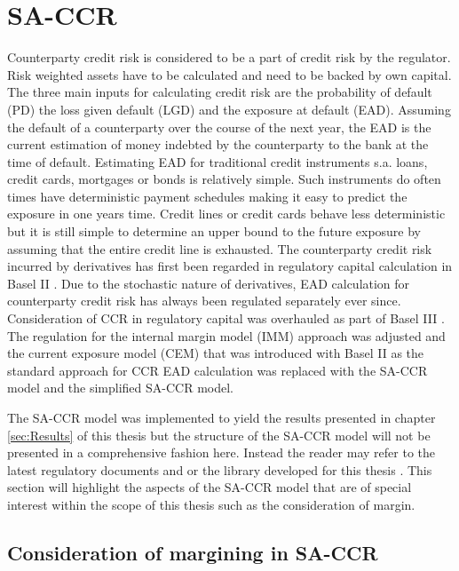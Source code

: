 \documentclass[../Thesis_AHoecherl.tex]{subfiles}
\begin{document}
\section{SA-CCR}\label{SA-CCR}

Counterparty credit risk is considered to be a part of credit risk by the regulator. Risk weighted assets have to be calculated and need to be backed by own capital. The three main inputs for calculating credit risk are the probability of default (PD) the loss given default (LGD) and the exposure at default (EAD). Assuming the default of a counterparty over the course of the next year, the EAD is the current estimation of money indebted by the counterparty to the bank at the time of default. Estimating EAD for traditional credit instruments s.a. loans, credit cards, mortgages or bonds is relatively simple. Such instruments do often times have deterministic payment schedules making it easy to predict the exposure in one years time. Credit lines or credit cards behave less deterministic but it is still simple to determine an upper bound to the future exposure by assuming that the entire credit line is exhausted.
The counterparty credit risk incurred by derivatives has first been regarded in regulatory capital calculation in Basel II \cite{basel2}. Due to the stochastic nature of derivatives, EAD calculation for counterparty credit risk has always been regulated separately ever since. Consideration of \gls{CCR} in regulatory capital was overhauled as part of Basel III . The regulation for the internal margin model (\gls{IMM}) approach was adjusted and the current exposure model (\gls{CEM}) that was introduced with Basel II as the standard approach for \gls{CCR} \gls{EAD} calculation was replaced with the \gls{SA-CCR} model and the simplified \gls{SA-CCR} model.

The \gls{SA-CCR} model was implemented to yield the results presented in chapter \ref{sec:Results} of this thesis but the structure of the \gls{SA-CCR} model will not be presented in a comprehensive fashion here. Instead the reader may refer to the latest regulatory documents  and  or the library developed for this thesis \cite{Hoecherl2020}.
This section will highlight the aspects of the SA-CCR model that are of special interest within the scope of this thesis such as the consideration of margin. 

\subsection{Consideration of margining in SA-CCR}
\end{document}
